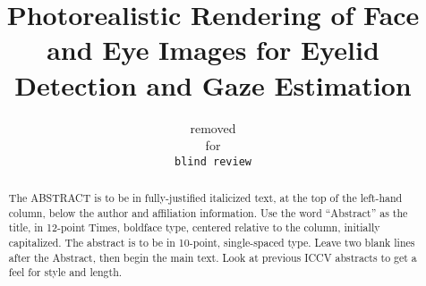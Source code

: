 \documentclass[10pt,twocolumn,letterpaper]{article}
\begin{document}
\title{Photorealistic Rendering of Face and Eye Images for Eyelid Detection and Gaze Estimation}

\author{removed\\
for\\
{\tt\small blind review}
}

\maketitle

\begin{abstract}
   The ABSTRACT is to be in fully-justified italicized text, at the top
   of the left-hand column, below the author and affiliation
   information. Use the word ``Abstract'' as the title, in 12-point
   Times, boldface type, centered relative to the column, initially
   capitalized. The abstract is to be in 10-point, single-spaced type.
   Leave two blank lines after the Abstract, then begin the main text.
   Look at previous ICCV abstracts to get a feel for style and length.
\end{abstract}









{\small


}
\end{document}
